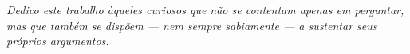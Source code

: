\begin{dedicatoria}
   \vspace*{\fill}
   \centering
   \noindent
	\textit{Dedico este trabalho àqueles curiosos que não se contentam apenas em perguntar, \\
            mas que também se dispõem — nem sempre sabiamente — a sustentar seus próprios argumentos.} \vspace*{\fill}
\end{dedicatoria}
